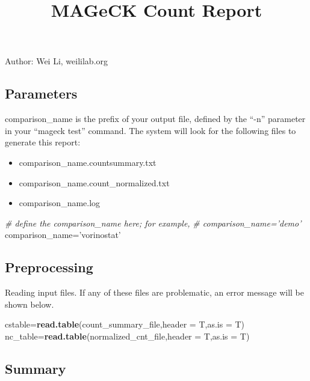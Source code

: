 \documentclass[]{article}
\title{MAGeCK Count Report}
\author{}
\date{\vspace{-2.5em}}
\newenvironment{Shaded}{\begin{snugshade}}{\end{snugshade}}
\newcommand{\CommentTok}[1]{\textcolor[rgb]{0.56,0.35,0.01}{\textit{#1}}}
\newcommand{\DataTypeTok}[1]{\textcolor[rgb]{0.13,0.29,0.53}{#1}}
\newcommand{\KeywordTok}[1]{\textcolor[rgb]{0.13,0.29,0.53}{\textbf{#1}}}
\newcommand{\NormalTok}[1]{#1}
\newcommand{\StringTok}[1]{\textcolor[rgb]{0.31,0.60,0.02}{#1}}
\providecommand{\tightlist}{%
  \setlength{\itemsep}{0pt}\setlength{\parskip}{0pt}}
\begin{document}
\maketitle

Author: Wei Li, weililab.org

\hypertarget{parameters}{%
\subsection{Parameters}\label{parameters}}

comparison\_name is the prefix of your output file, defined by the
``-n'' parameter in your ``mageck test'' command. The system will look
for the following files to generate this report:

\begin{itemize}
\tightlist
\item
  comparison\_name.countsummary.txt
\item
  comparison\_name.count\_normalized.txt
\item
  comparison\_name.log
\end{itemize}

\begin{Shaded}
\begin{Highlighting}[]
\CommentTok{# define the comparison_name here; for example,}
\CommentTok{# comparison_name='demo'}
\NormalTok{comparison_name=}\StringTok{'vorinostat'}
\end{Highlighting}
\end{Shaded}

\hypertarget{preprocessing}{%
\subsection{Preprocessing}\label{preprocessing}}

Reading input files. If any of these files are problematic, an error
message will be shown below.

\begin{Shaded}
\begin{Highlighting}[]
\NormalTok{cstable=}\KeywordTok{read.table}\NormalTok{(count_summary_file,}\DataTypeTok{header =}\NormalTok{ T,}\DataTypeTok{as.is =}\NormalTok{ T)}
\NormalTok{nc_table=}\KeywordTok{read.table}\NormalTok{(normalized_cnt_file,}\DataTypeTok{header =}\NormalTok{ T,}\DataTypeTok{as.is =}\NormalTok{ T)}
\end{Highlighting}
\end{Shaded}

\hypertarget{summary}{%
\subsection{Summary}\label{summary}}
\end{document}
